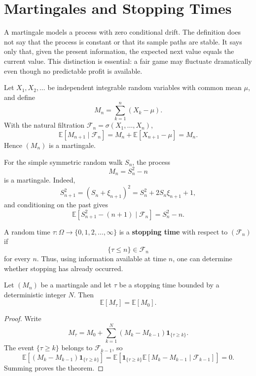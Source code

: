 \section{Martingales and Stopping Times}

A martingale models a process with zero conditional drift. The definition does not say that the process is constant or that its sample paths are stable. It says only that, given the present information, the expected next value equals the current value. This distinction is essential: a fair game may fluctuate dramatically even though no predictable profit is available.

\begin{example}
Let $X_1,X_2,\dots$ be independent integrable random variables with common mean $\mu$, and define
\[
    M_n=\sum_{k=1}^n(X_k-\mu).
\]
With the natural filtration $\mathcal{F}_n=\sigma(X_1,\dots,X_n)$,
\[
    \mathbb{E}[M_{n+1}\mid\mathcal{F}_n]
    =M_n+\mathbb{E}[X_{n+1}-\mu]
    =M_n.
\]
Hence $(M_n)$ is a martingale.
\end{example}

\begin{example}
For the simple symmetric random walk $S_n$, the process
\[
    M_n=S_n^2-n
\]
is a martingale. Indeed,
\[
    S_{n+1}^2=(S_n+\xi_{n+1})^2
    =S_n^2+2S_n\xi_{n+1}+1,
\]
and conditioning on the past gives
\[
    \mathbb{E}[S_{n+1}^2-(n+1)\mid\mathcal{F}_n]
    =S_n^2-n.
\]
\end{example}

\begin{definition}
A random time $\tau:\Omega\to\{0,1,2,\dots,\infty\}$ is a \textbf{stopping time} with respect to $(\mathcal{F}_n)$ if
\[
    \{\tau\leq n\}\in\mathcal{F}_n
\]
for every $n$. Thus, using information available at time $n$, one can determine whether stopping has already occurred.
\end{definition}

\begin{theorem}
Let $(M_n)$ be a martingale and let $\tau$ be a stopping time bounded by a deterministic integer $N$. Then
\[
    \mathbb{E}[M_\tau]=\mathbb{E}[M_0].
\]
\end{theorem}

\begin{proof}
Write
\[
    M_\tau=M_0+\sum_{k=1}^N
    (M_k-M_{k-1})\mathbf{1}_{\{\tau\geq k\}}.
\]
The event $\{\tau\geq k\}$ belongs to $\mathcal{F}_{k-1}$, so
\[
\mathbb{E}[(M_k-M_{k-1})\mathbf{1}_{\{\tau\geq k\}}]
=\mathbb{E}\left[
\mathbf{1}_{\{\tau\geq k\}}
\mathbb{E}[M_k-M_{k-1}\mid\mathcal{F}_{k-1}]
\right]=0.
\]
Summing proves the theorem.
\end{proof}


